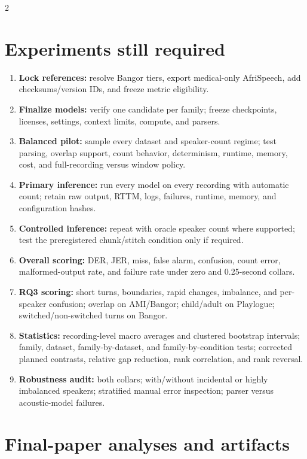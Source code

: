 \documentclass[9pt]{extarticle}
\begin{document}
\begin{multicols}{2}
\raggedcolumns

\section*{Experiments still required}

\begin{enumerate}
  \item \textbf{Lock references:} resolve Bangor tiers, export medical-only
  AfriSpeech, add checksums/version IDs, and freeze metric eligibility.
  \item \textbf{Finalize models:} verify one candidate per family; freeze
  checkpoints, licenses, settings, context limits, compute, and parsers.
  \item \textbf{Balanced pilot:} sample every dataset and speaker-count regime;
  test parsing, overlap support, count behavior, determinism, runtime, memory,
  cost, and full-recording versus window policy.
  \item \textbf{Primary inference:} run every model on every recording with
  automatic count; retain raw output, RTTM, logs, failures, runtime, memory, and
  configuration hashes.
  \item \textbf{Controlled inference:} repeat with oracle speaker count where
  supported; test the preregistered chunk/stitch condition only if required.
  \item \textbf{Overall scoring:} DER, JER, miss, false alarm, confusion,
  count error, malformed-output rate, and failure rate under zero and
  0.25-second collars.
  \item \textbf{RQ3 scoring:} short turns, boundaries, rapid changes,
  imbalance, and per-speaker confusion; overlap on AMI/Bangor; child/adult on
  Playlogue; switched/non-switched turns on Bangor.
  \item \textbf{Statistics:} recording-level macro averages and clustered
  bootstrap intervals; family, dataset, family-by-dataset, and
  family-by-condition tests; corrected planned contrasts, relative gap
  reduction, rank correlation, and rank reversal.
  \item \textbf{Robustness audit:} both collars; with/without incidental or
  highly imbalanced speakers; stratified manual error inspection; parser versus
  acoustic-model failures.
\end{enumerate}

\columnbreak

\section*{Final-paper analyses and artifacts}


\end{multicols}
\end{document}
